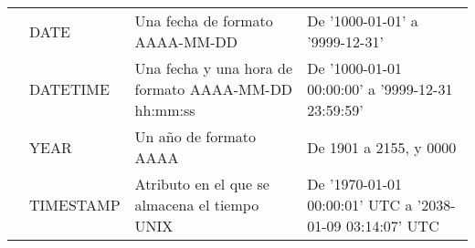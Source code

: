 \documentclass[12pt]{report}
\begin{document}
\begin{center}
\begin{longtable}{c m{2.5cm} m{4cm} m{5cm}}
								&	DATE			&	Una fecha de formato AAAA-MM-DD											&	De '1000-01-01' a '9999-12-31'\\
								&	DATETIME	&	Una fecha y una hora de formato AAAA-MM-DD hh:mm:ss	&	De '1000-01-01 00:00:00' a '9999-12-31 23:59:59'\\
								&	YEAR			&	Un año de formato AAAA															&	De 1901 a 2155, y 0000\\
								&	TIMESTAMP	&	Atributo en el que se almacena el tiempo UNIX				&	De '1970-01-01 00:00:01' UTC a '2038-01-09 03:14:07' UTC
						\end{longtable}
					\end{center}
\end{document}
